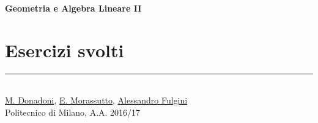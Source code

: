 




\raggedright
\footnotesize
\begin{multicols}{3}

\setlength{\premulticols}{1pt}
\setlength{\postmulticols}{1pt}
\setlength{\multicolsep}{1pt}
\setlength{\columnsep}{2pt}

{\Large{\textbf{Geometria e Algebra Lineare II}}}















\section{Esercizi svolti}
% 








\rule{0.3\linewidth}{0.25pt}
\scriptsize\\
\href{mailto:marco.donadoni@mail.polimi.it}{M. Donadoni}, \href{mailto:edoardo.morassutto@mail.polimi.it}{E. Morassutto},
\href{mailto:alessandro.fulgini@mail.polimi,it}{Alessandro Fulgini} \\
Politecnico di Milano, A.A. 2016/17
\end{multicols}

